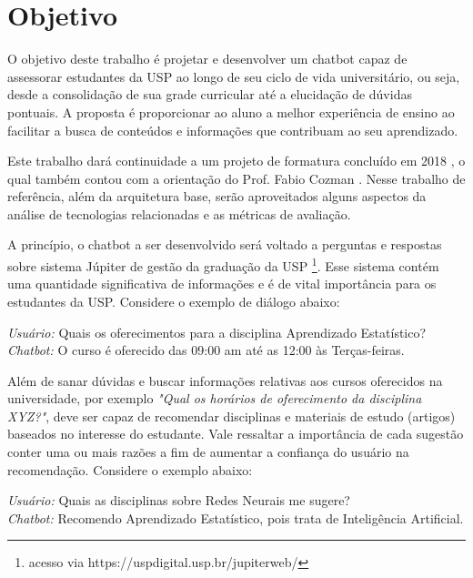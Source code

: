 \documentclass[]{politex}
\begin{document}
\section{Objetivo}

O objetivo deste trabalho é projetar e desenvolver um chatbot capaz de assessorar estudantes da USP ao longo de seu ciclo de vida universitário, ou seja, desde a consolidação de sua grade curricular até a elucidação de dúvidas pontuais. A proposta é proporcionar ao aluno a melhor experiência de ensino ao facilitar a busca de conteúdos e informações que contribuam ao seu aprendizado.

Este trabalho dará continuidade  a um projeto de formatura concluído em 2018 , o qual também contou com a orientação do Prof. Fabio Cozman \cite{Correa-et-al-2018}. Nesse trabalho de referência, além da arquitetura base, serão aproveitados alguns aspectos da análise de tecnologias relacionadas e as métricas de avaliação.

A princípio, o chatbot a ser desenvolvido será voltado a perguntas e respostas sobre sistema Júpiter de gestão da graduação da USP \footnote{acesso via https://uspdigital.usp.br/jupiterweb/}. Esse sistema contém uma quantidade significativa de informações e é de vital importância para os estudantes da USP. Considere o exemplo de diálogo abaixo:

\begin{flushleft}
    \textit{Usuário:} Quais os oferecimentos para a disciplina Aprendizado Estatístico? \\
    \textit{Chatbot:} O curso é oferecido das 09:00 am até as 12:00 às Terças-feiras.
\end{flushleft}

Além de sanar dúvidas e buscar informações relativas aos cursos oferecidos na universidade, por exemplo \textit{"Qual os horários de oferecimento da disciplina XYZ?"}, deve ser capaz de recomendar disciplinas e materiais de estudo (artigos) baseados no interesse do estudante. Vale ressaltar a importância de cada sugestão conter uma ou mais razões a fim de aumentar a confiança do usuário na recomendação. Considere o exemplo abaixo:

\begin{flushleft}
    \textit{Usuário:} Quais as disciplinas sobre Redes Neurais me sugere? \\
    \textit{Chatbot:} Recomendo Aprendizado Estatístico, pois trata de Inteligência Artificial.
\end{flushleft}
\end{document}
